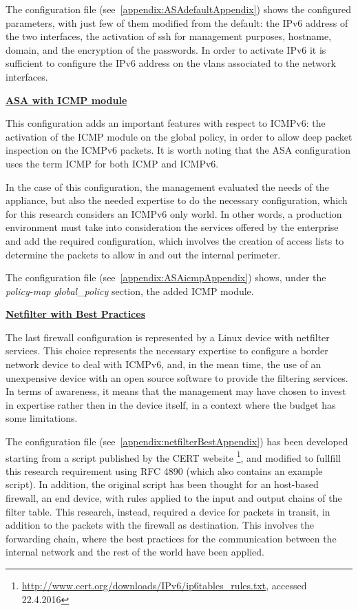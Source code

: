 \documentclass[12pt]{article}
\begin{document}
The configuration file (see~\cref{appendix:ASAdefaultAppendix}) shows the configured parameters, with just few of them modified from the default: the IPv6 address of the two interfaces, the activation of ssh for management purposes, hostname, domain, and the encryption of the passwords. In order to activate IPv6 it is sufficient to configure the IPv6 address on the vlans associated to the network interfaces.

\textbf{\underline{ASA with ICMP module}}
\label{subsub:asaDefaultICMP}

This configuration adds an important features with respect to ICMPv6: the activation of the ICMP module on the global policy, in order to allow deep packet inspection on the ICMPv6 packets. It is worth noting that the ASA configuration uses the term ICMP for both ICMP and ICMPv6.

In the case of this configuration, the management evaluated the needs of the appliance, but also the needed expertise to do the necessary configuration, which for this research considers an ICMPv6 only world. In other words, a production environment must take into consideration the services offered by the enterprise and add the required configuration, which involves the creation of access lists to determine the packets to allow in and out the internal perimeter.

The configuration file (see~\cref{appendix:ASAicmpAppendix}) shows, under the \textit{policy-map global_policy} section, the added ICMP module.

\textbf{\underline{Netfilter with Best Practices}}
\label{subsub:netfilterBestPractices}

The last firewall configuration is represented by a Linux device with netfilter services. This choice represents the necessary expertise to configure a border network device to deal with ICMPv6, and, in the mean time, the use of an unexpensive device with an open source software to provide the filtering services. In terms of awareness, it means that the management may have chosen to invest in expertise rather then in the device itself, in a context where the budget has some limitations.

The configuration file (see~\cref{appendix:netfilterBestAppendix}) has been developed starting from a script published by the CERT website \footnote{\url{http://www.cert.org/downloads/IPv6/ip6tables_rules.txt}, accessed 22.4.2016}, and modified to fullfill this research requirement using RFC 4890 (which also contains an example script)\cite{rfc4890}. In addition, the original script has been thought for an host-based firewall, an end device, with rules applied to the input and output chains of the filter table. This research, instead, required a device for packets in transit, in addition to the packets with the firewall as destination. This involves the forwarding chain, where the best practices for the communication between the internal network and the rest of the world have been applied.
\end{document}
